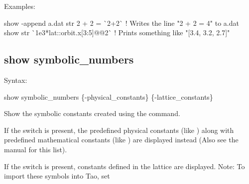 {{{{{{{{{Examples:
\begin{example}
  show -append a.dat str 2 + 2 = \`{}2+2\`{} ! Writes the line "2 + 2 = 4" to a.dat
  show str \`{}1e3*lat::orbit.x[3:5]@@2\`{}  ! Prints something like "[3.4, 3.2, 2.7]"
\end{example}


\subsection{show symbolic_numbers}
\label{s:show.symbolic}

Syntax:
\begin{example}
  show symbolic_numbers \{-physical_constants\} \{-lattice_constants\}
\end{example}

Show the symbolic constants created using the  command. 

If the  switch is present, the predefined physical constants (like
) along with predefined mathematical constants (like ) are displayed instead
(Also see the \bmad manual for this list).

If the  switch is present, constants defined in the lattice are displayed.
Note: To import these symbols into Tao, set \vn{global%
\vn{-symbol_import} switch on the startup command line). The default is to not import lattice
symbols.

Examples:
\begin{example}
  set sym aaa = 23  ! Set a symbol.
  show sym          ! Show all user defined symbols.
  show sym -phys    ! Show predefined physical and mathematical constants.
\end{example}


\subsection{show taylor_map}
\label{s:show.taylor}

Syntax:
\begin{example}
  show taylor_map \{-angle_coordinates\} \{-eigen_modes\} \{-lattice_format\} 
            \{-number_format <fmt>\} \{-order <n_order>\} \{-ptc\} \{-radiation\}
            \{-s\} \{-universe\} \{loc1 \{loc2\}\}
\end{example}

}}}}}}}}}}
